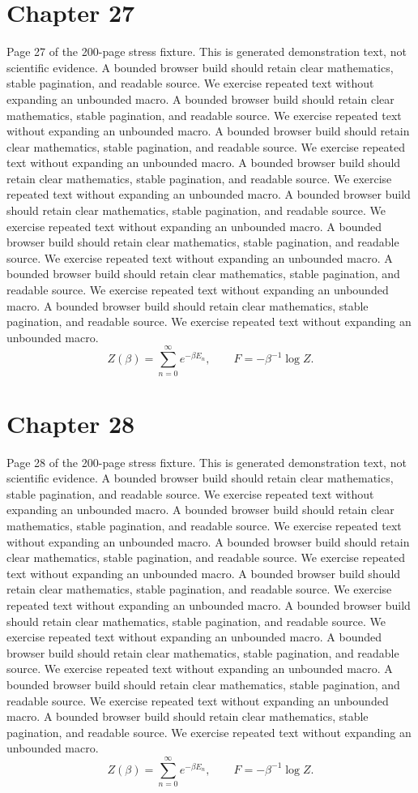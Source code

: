 \documentclass[11pt]{article}
\begin{document}
\section*{Chapter 27}
Page 27 of the 200-page stress fixture. This is generated demonstration text, not scientific evidence.
A bounded browser build should retain clear mathematics, stable pagination, and readable source. We exercise repeated text without expanding an unbounded macro.
A bounded browser build should retain clear mathematics, stable pagination, and readable source. We exercise repeated text without expanding an unbounded macro.
A bounded browser build should retain clear mathematics, stable pagination, and readable source. We exercise repeated text without expanding an unbounded macro.
A bounded browser build should retain clear mathematics, stable pagination, and readable source. We exercise repeated text without expanding an unbounded macro.
A bounded browser build should retain clear mathematics, stable pagination, and readable source. We exercise repeated text without expanding an unbounded macro.
A bounded browser build should retain clear mathematics, stable pagination, and readable source. We exercise repeated text without expanding an unbounded macro.
A bounded browser build should retain clear mathematics, stable pagination, and readable source. We exercise repeated text without expanding an unbounded macro.
A bounded browser build should retain clear mathematics, stable pagination, and readable source. We exercise repeated text without expanding an unbounded macro.
\[Z(\beta)=\sum_{n=0}^{\infty}e^{-\beta E_n},\qquad F=-\beta^{-1}\log Z.\]
\newpage
\section*{Chapter 28}
Page 28 of the 200-page stress fixture. This is generated demonstration text, not scientific evidence.
A bounded browser build should retain clear mathematics, stable pagination, and readable source. We exercise repeated text without expanding an unbounded macro.
A bounded browser build should retain clear mathematics, stable pagination, and readable source. We exercise repeated text without expanding an unbounded macro.
A bounded browser build should retain clear mathematics, stable pagination, and readable source. We exercise repeated text without expanding an unbounded macro.
A bounded browser build should retain clear mathematics, stable pagination, and readable source. We exercise repeated text without expanding an unbounded macro.
A bounded browser build should retain clear mathematics, stable pagination, and readable source. We exercise repeated text without expanding an unbounded macro.
A bounded browser build should retain clear mathematics, stable pagination, and readable source. We exercise repeated text without expanding an unbounded macro.
A bounded browser build should retain clear mathematics, stable pagination, and readable source. We exercise repeated text without expanding an unbounded macro.
A bounded browser build should retain clear mathematics, stable pagination, and readable source. We exercise repeated text without expanding an unbounded macro.
\[Z(\beta)=\sum_{n=0}^{\infty}e^{-\beta E_n},\qquad F=-\beta^{-1}\log Z.\]
\newpage
\end{document}
